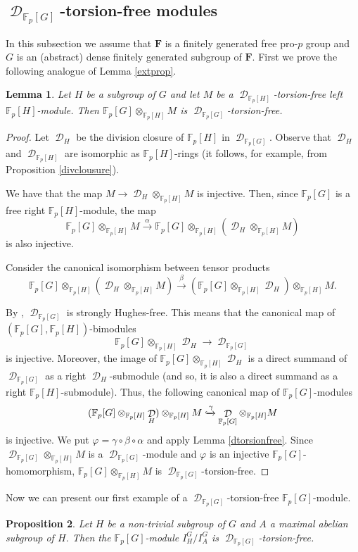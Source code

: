 \documentclass[11pt]{amsart}
\newtheorem{lem}{Lemma}[section]
\newtheorem{pro}[lem]{Proposition}
\numberwithin{claimcounter}{lem}
\DeclareMathOperator{\D}{\mathcal D}
\newcommand{\F}{\mathbb{F}}
\begin{document}
\subsection{$\D_{\F_p[G]}$-torsion-free modules} 
In this subsection we assume that $\mathbf F$ is a finitely generated free pro-$p$ group and  $G$ is an (abstract) dense finitely generated  subgroup of $\mathbf F$. First we  prove the following analogue of Lemma \ref{extprop}.
\begin{lem}
 \label{extabs}  Let $H$ be a subgroup of $G$ and
let $M$ be a $\D_{\F_p[H]}$-torsion-free left $\F_p[H]$-module. Then $\F_p[G]\otimes_{\F_p[H]} M$ is $\D_{\F_p[G]}$-torsion-free.
\end{lem}
\begin{proof}   Let $\D_H$ be the division closure of $\F_p[H]$ in $\D_{\F_p[G]}$. Observe that $\D_H$ and $\D_{\F_p[H]}$ are isomorphic as  $\F_p[H]$-rings (it follows, for example, from Proposition \ref{divclousure}).

We have  that the map $ M\to \D_H\otimes_{\F_p[H]}M$ is injective. Then, since $\F_p[G]$ is a free right $\F_p[H]$-module, the map
$$\F_p[G]\otimes_{\F_p[H]}M\xrightarrow {\alpha}\F_p[G]\otimes_{\F_p[H]}( \D_H\otimes_{\F_p[H]} M)$$ is also injective. 

Consider  the canonical isomorphism between tensor products 
$$\F_p[G]\otimes_{\F_p[H]}( \D_H\otimes_{\F_p[H]} M)\xrightarrow {\beta} (\F_p[G]\otimes_{\F_p[H]} \D_H)\otimes_{\F_p[H]} M.$$ 

By \cite{Gra19}, $\D_{\F_p[G]}$ is strongly Hughes-free. This means that
 the canonical map  of $(\F_p[G],\F_p[H])$-bimodules $$\F_p[G]\otimes_{\F_p[H]} \D_H\to \D_{\F_p[G]}$$ is injective. Moreover, the image of $\F_p[G]\otimes_{\F_p[H]} \D_H$  is a direct    summand of $\D_{\F_p[G]}$ as a right $\D_H$-submodule (and so, it is also a direct  summand as a right $\F_p[H]$-submodule). Thus,  the following canonical map  of $\F_p[G]$-modules
 $$ (\F_p[G]\otimes_{\F_p[H]} \D_H)\otimes_{\F_p[H]}M \xhookrightarrow {\gamma}  \D_{\F_p[G]}\otimes_{\F_p[H]} M$$ 
 is injective. 
We put $\varphi=\gamma\circ \beta\circ \alpha$ and apply Lemma \ref{dtorsionfree}. Since $  \D_{\F_p[G]}\otimes_{\F_p[H]} M$ is a $\D_{\F_p[G]}$-module and $\varphi$ is an injective $\F_p[G]$-homomorphism, $\F_p[G]\otimes_{\F_p[H]} M$ is $\D_{\F_p[G]}$-torsion-free.


\end{proof}
   Now we can present our first example of a $\D_{\F_p[G]}$-torsion-free $\F_p[G]$-module.
\begin{pro} \label{quot} Let $H$ be a non-trivial subgroup of $G$ and $A$ a maximal abelian subgroup of $H$. Then the $\F_p[G]$-module $I^G_H/I^G_A$ is $\D_{\F_p[G]}$-torsion-free.
\end{pro}
\end{document}
